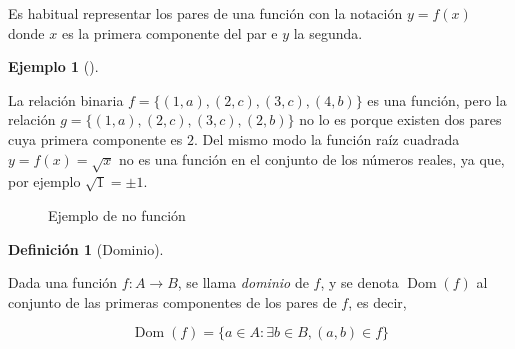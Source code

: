 \documentclass[
  a4paper,
]{scrreport}
\theoremstyle{plain}
\theoremstyle{plain}
\theoremstyle{definition}
\newtheorem{definition}{Definición}[chapter]
\theoremstyle{definition}
\newtheorem{example}{Ejemplo}[chapter]
\theoremstyle{plain}
\theoremstyle{remark}
\begin{document}
Es habitual representar los pares de una función con la notación
\(y=f(x)\) donde \(x\) es la primera componente del par e \(y\) la
segunda.

\leavevmode{}%
\begin{example}[]\label{exm-funcion}

La relación binaria \(f=\{(1,a), (2,c), (3,c), (4,b)\}\) es una función,
pero la relación \(g=\{(1,a), (2,c), (3,c), (2,b)\}\) no lo es porque
existen dos pares cuya primera componente es \(2\). Del mismo modo la
función raíz cuadrada \(y=f(x)=\sqrt{x}\) no es una función en el
conjunto de los números reales, ya que, por ejemplo \(\sqrt{1}=\pm 1\).

\end{example}

\begin{figure}

\begin{minipage}[t]{0.50\linewidth}

{\centering 

\raisebox{-\height}{



}

\caption{Ejemplo de función}

}

\end{minipage}%
%
\begin{minipage}[t]{0.50\linewidth}

{\centering 

\raisebox{-\height}{



}

\caption{Ejemplo de no función}

}

\end{minipage}%

\end{figure}

\leavevmode{}%
\begin{definition}[Dominio]\label{def-dominio-funcion}

Dada una función \(f:A\rightarrow B\), se llama \emph{dominio} de \(f\),
y se denota \(\operatorname{Dom}(f)\) al conjunto de las primeras
componentes de los pares de \(f\), es decir,

\[\operatorname{Dom}(f) = \{a\in A: \exists b\in B, (a,b)\in f\}\]

\end{definition}
\end{document}
